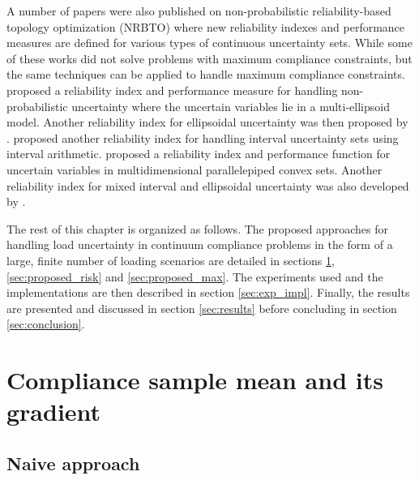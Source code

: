     A number of papers were also published on non-probabilistic reliability-based topology optimization (NRBTO) where new reliability indexes and performance measures are defined for various types of continuous uncertainty sets. While some of these works did not solve problems with maximum compliance constraints, but the same techniques can be applied to handle maximum compliance constraints. \cite{Luo2009} proposed a reliability index and performance measure for handling non-probabilistic uncertainty where the uncertain variables lie in a multi-ellipsoid model. Another reliability index for ellipsoidal uncertainty was then proposed by \cite{Wang2018a}. \cite{Wang2017,Wang2019a} proposed another reliability index for handling interval uncertainty sets using interval arithmetic. \cite{Zheng2018a} proposed a reliability index and performance function for uncertain variables in multidimensional parallelepiped convex sets. Another reliability index for mixed interval and ellipsoidal uncertainty was also developed by \cite{Wang2019b}.

    The rest of this chapter is organized as follows. The proposed approaches for handling load uncertainty in continuum compliance problems in the form of a large, finite number of loading scenarios are detailed in sections \ref{sec:proposed_mean}, \ref{sec:proposed_risk} and \ref{sec:proposed_max}. The experiments used and the implementations are then described in section \ref{sec:exp_impl}. Finally, the results are presented and discussed in section \ref{sec:results} before concluding in section \ref{sec:conclusion}.

\section{Compliance sample mean and its gradient} \label{sec:proposed_mean}

  \subsection{Naive approach}

